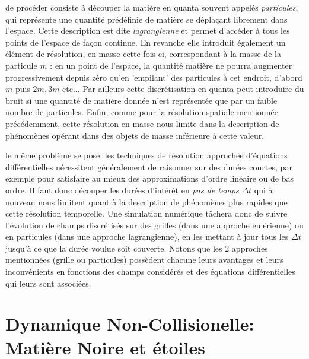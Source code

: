  de procéder consiste à découper la matière en quanta souvent appelés \textit{particules}, qui représente une quantité prédéfinie de matière se déplaçant librement dans l'espace. Cette description est dite \textit{lagrangienne} et permet d'accéder à tous les points de l'espace de façon continue. En revanche elle introduit également un élément de résolution, en masse cette fois-ci, correspondant à la masse de la particule $m$ : en un point de l'espace, la quantité matière ne pourra augmenter progressivement depuis zéro qu'en 'empilant' des particules à cet endroit, d'abord $m$ puis $2m,3m$ etc... Par ailleurs cette discrétisation en quanta peut introduire du bruit si une quantité de matière donnée n'est représentée que par un faible nombre de particules. Enfin, comme pour la résolution spatiale mentionnée précédemment, cette résolution en masse nous limite dans la description de phénomènes opérant dans des objets de masse inférieure à cette valeur.

 le même problème se pose: les techniques de résolution approchée d'équations différentielles nécessitent généralement de raisonner sur des durées courtes, par exemple pour satisfaire au mieux des approximations d'ordre linéaire ou de bas ordre. Il faut donc découper les durées d'intérêt en \textit{pas de temps} $\Delta t$ qui à nouveau nous limitent quant à la description de phénomènes plus rapides que cette résolution temporelle. Une simulation numérique tâchera donc de suivre l'évolution de champs discrétisés sur des grilles (dans une approche eulérienne) ou en particules (dans une approche lagrangienne), en les mettant à jour tous les $\Delta t$ jusqu'à ce que la durée voulue soit couverte. Notons que les 2 approches mentionnées (grille ou particules) possèdent chacune leurs avantages et leurs inconvénients en fonctions des champs considérés et des équations différentielles qui leurs sont associées.


\section{Dynamique Non-Collisionelle: Matière Noire et étoiles}

